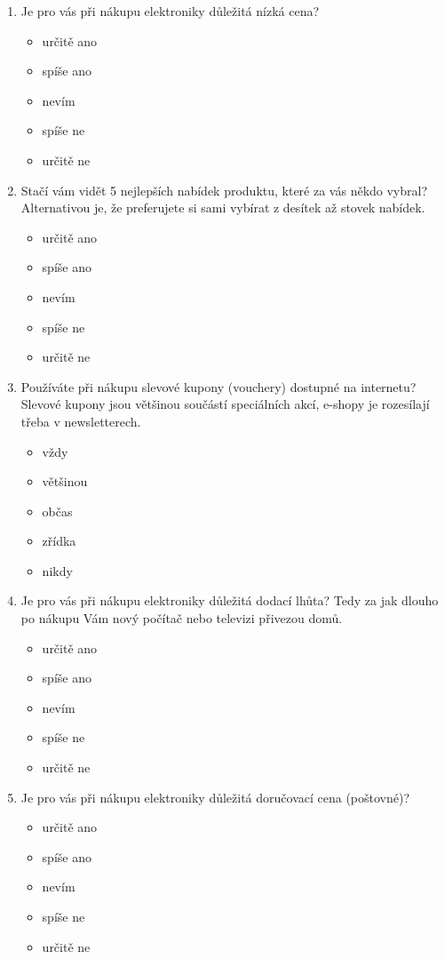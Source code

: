 \documentclass[12pt,twoside,openany]{fithesis}
\begin{document}
\begin{enumerate}
  \item Je pro vás při nákupu elektroniky důležitá nízká cena? 
    \begin{itemize}
       \item určitě ano
       \item spíše ano
       \item nevím
       \item spíše ne
       \item určitě ne
    \end{itemize}

  \item Stačí vám vidět 5 nejlepších nabídek produktu, které za vás někdo vybral?
      Alternativou je, že preferujete si sami vybírat z desítek až stovek nabídek.
    \begin{itemize}
       \item určitě ano
       \item spíše ano
       \item nevím
       \item spíše ne
       \item určitě ne
    \end{itemize}

\item Používáte při nákupu slevové kupony (vouchery) dostupné na internetu?
    Slevové kupony jsou většinou součástí speciálních akcí, e-shopy je rozesílají třeba v newsletterech. 
    \begin{itemize}
       \item vždy
       \item většinou
       \item občas
       \item zřídka
       \item nikdy
    \end{itemize}

  \item Je pro vás při nákupu elektroniky důležitá dodací lhůta?
      Tedy za jak dlouho po nákupu Vám nový počítač nebo televizi přivezou domů.
    \begin{itemize}
       \item určitě ano
       \item spíše ano
       \item nevím
       \item spíše ne
       \item určitě ne
    \end{itemize}

\item Je pro vás při nákupu elektroniky důležitá doručovací cena (poštovné)?
    \begin{itemize}
       \item určitě ano
       \item spíše ano
       \item nevím
       \item spíše ne
       \item určitě ne
    \end{itemize}


\end{enumerate}
\end{document}
